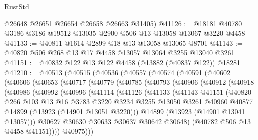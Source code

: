 \begin{lexlean}{RustStd}
\begin{coremodule}
      @26648
      @26651
      @26654
      @26658
      @26663
      @31405)
@41126 := @18181 @40780 @3186 @3186 @19512 @13035 @2900 @506 @13 @13058 @13067 @3220 @4458
@41133 := @40811 @1614 @2899 @18 @13 @13058 @13065 @8701
@41143 := @40820 @506 @268 @13 @17 @4458 @13057 @13064 @3255 @13040 @3261
@41151 := @40832 @122 @13 @122 @4458 (@13882 (@40837 @122)) @18281
@41210 := @40513
    (@40515
      (@40536
        (@40557
          (@40574
            (@40591
              (@40602
                (@40606
                  (@40653
                    (@40717
                      (@40779
                        (@40785
                          (@40793
                            (@40906
                              (@40912
                                (@40918
                                  (@40986
                                    (@40992
                                      (@40996
                                        (@41114
                                          (@41126
                                            (@41133
                                              (@41143
                                                @41151
                                                (@40820
                                                  @266
                                                  @103
                                                  @13
                                                  @16
                                                  @3783
                                                  @3220
                                                  @3234
                                                  @3255
                                                  @13050
                                                  @3261
                                                  @40960
                                                  @40877
                                                  @14899
                                                  (@13923 (@14901 @13051 @3220)))
                                                @14899
                                                (@13923 (@14901 @13041 @13057)))
                                              @30627
                                              @30630
                                              @30633
                                              @30637
                                              @30642
                                              @30648)
                                            (@40782 @506 @13 @4458 @41151))))
                                      @40975)))

\end{coremodule}
\end{lexlean}

